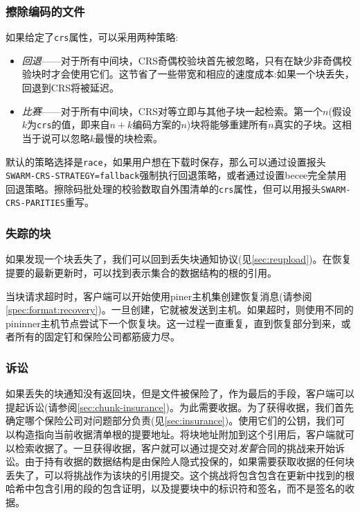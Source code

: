 \subsubsection{擦除编码的文件}

如果给定了\lstinline{crs}属性，可以采用两种策略: 

\begin{itemize}
\item \emph{回退}——对于所有中间块，CRS奇偶校验块首先被忽略，只有在缺少非奇偶校验块时才会使用它们。这节省了一些带宽和相应的速度成本:如果一个块丢失，回退到CRS将被延迟。
\item \emph{比赛}——对于所有中间块，CRS对等立即与其他子块一起检索。第一个$n$(假设$k$为\lstinline{crs}的值，即来自$n+k$编码方案的$n$)块将能够重建所有$n$真实的子块。这相当于说可以忽略$k$最慢的块检索。  
\end{itemize}

默认的策略选择是\lstinline{race}，如果用户想在下载时保存，那么可以通过设置报头\lstinline{SWARM-CRS-STRATEGY=fallback}强制执行回退策略，或者通过设置becee完全禁用回退策略。擦除码批处理的校验数取自外围清单的\lstinline{crs}属性，但可以用报头\lstinline{SWARM-CRS-PARITIES}重写。

\subsubsection{失踪的块}

如果发现一个块丢失了，我们可以回到丢失块通知协议(见\ref{sec:reupload})。在恢复提要的最新更新时，可以找到表示集合的数据结构的根的引用。 

当块请求超时时，客户端可以开始使用piner主机集创建恢复消息(请参阅\ref{spec:format:recovery})。一旦创建，它就被发送到主机。如果超时，则使用不同的pininner主机节点尝试下一个恢复块。这一过程一直重复，直到恢复部分到来，或者所有的固定钉和保险公司都筋疲力尽。

\subsubsection{诉讼}

如果丢失的块通知没有返回块，但是文件被保险了，作为最后的手段，客户端可以提起诉讼(请参阅\ref{sec:chunk-insurance})。为此需要收据。为了获得收据，我们首先确定哪个保险公司对问题部分负责(见\ref{sec:insurance})。使用它们的公钥，我们可以构造指向当前收据清单根的提要地址。将块地址附加到这个引用后，客户端就可以检索收据了。一旦获得收据，客户就可以通过提交对\emph{发誓}合同的挑战来开始诉讼。由于持有收据的数据结构是由保险人隐式投保的，如果需要获取收据的任何块丢失了，可以将挑战作为该块的引用提交。这个挑战将包含包含在更新中找到的根哈希中包含引用的段的包含证明，以及提要块中的标识符和签名，而不是签名的收据。 


